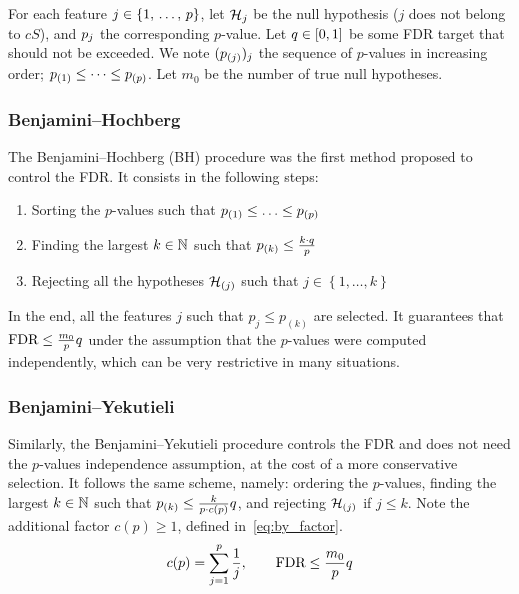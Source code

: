 For each feature $j \in \left\{ 1,\, \dots,\, p \right\}$, let $\mathcal{H}_j$ be the null hypothesis ($j$ does not belong to $cS$),
and $p_j$ the corresponding $p$-value.
Let $q \in [0, 1]$ be some FDR target that should not be exceeded.
We note $(p_{(j)})_j$ the sequence of $p$-values in increasing order;
$p_{(1)} \leq \dots \leq p_{(p)}$.
Let $m_0$ be the number of true null hypotheses.

\subsubsection{Benjamini–Hochberg}\label{subsubsec:bh}

The Benjamini–Hochberg (BH) procedure was the first method proposed to control the FDR\@.
It consists in the following steps:
\begin{enumerate}
    \item Sorting the $p$-values such that $p_{(1)} \leq \ldots \leq p_{(p)}$
    \item Finding the largest $k \in \mathbb{N}$ such that $p_{(k)} \leq \frac{k \cdot q}{p}$
    \item Rejecting all the hypotheses $\mathcal{H}_{(j)}$ such that $j \in \left\{ 1, \dots, k \right\}$
\end{enumerate}
In the end, all the features $j$ such that $p_j \leq p_{(k)}$ are selected.
It guarantees that $\text{FDR} \leq \frac{m_0}{p}q$ under the assumption that the $p$-values were computed
independently, which can be very restrictive in many situations.

\subsubsection{Benjamini–Yekutieli}\label{subsubsec:by}

Similarly, the Benjamini–Yekutieli procedure controls the FDR
and does not need the $p$-values independence assumption,
at the cost of a more conservative selection.
It follows the same scheme, namely:
ordering the $p$-values,
finding the largest $k \in \mathbb{N}$ such that $p_{(k)} \leq \frac{k}{p \cdot c(p)}q$,
and rejecting $\mathcal{H}_{(j)}$ if $j \leq k$.
Note the additional factor $c(p) \geq 1$, defined in~\ref{eq:by_factor}.
\begin{equation}\label{eq:by_factor}
c(p) = \sum_{j = 1}^p \frac{1}{j}
,\qquad
\text{FDR} \leq \frac{m_0}{p}q
\end{equation}

